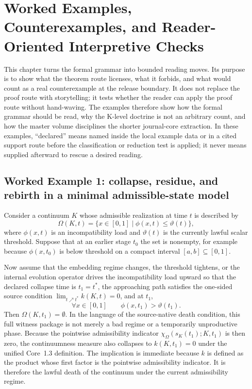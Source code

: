 \section{Worked Examples, Counterexamples, and Reader-Oriented Interpretive Checks}
\label{sec:oc13-worked-examples}

This chapter turns the formal grammar into bounded reading moves. Its purpose
is to show what the theorem route licenses, what it forbids, and what would
count as a real counterexample at the release boundary. It does not replace the
proof route with storytelling; it tests whether the reader can apply the proof
route without hand-waving. The examples therefore show how the formal grammar
should be read, why the K-level doctrine is not an arbitrary count, and how the
master volume disciplines the shorter journal-core extraction.
In these examples, ``declared'' means named inside the local example data or in
a cited support route before the classification or reduction test is applied;
it never means supplied afterward to rescue a desired reading.

\subsection{Worked Example 1: collapse, residue, and rebirth in a minimal admissible-state model}

Consider a continuum \(K\) whose admissible realization at time \(t\) is described by
\[
\Omega(K,t) = \{x \in [0,1] \mid \phi(x,t) \le \vartheta(t)\},
\]
where \(\phi(x,t)\) is an incompatibility load and \(\vartheta(t)\) is the currently lawful scalar
threshold. Suppose that at an earlier stage \(t_0\) the set is nonempty, for example because
\(\phi(x,t_0)\) is below threshold on a compact interval \([a,b]\subseteq [0,1]\).

Now assume that the embedding regime changes, the threshold tightens, or the internal evolution
operator drives the incompatibility load upward so that the declared collapse time is
\(t_1=t^\ast\), the approaching path satisfies the one-sided source condition
\(\lim_{t\nearrow t^\ast} k(K,t)=0\), and at \(t_1\),
\[
\forall x \in [0,1] \qquad \phi(x,t_1) > \vartheta(t_1).
\]
Then \(\Omega(K,t_1)=\emptyset\). In the language of the source-native death condition, this full
witness package is
not merely a bad regime or a temporarily unproductive phase. Because the
pointwise admissibility indicator \(\chi_{\Omega}(s_K(t_1);K,t_1)\) is then zero, the
continuumness measure also collapses to \(k(K,t_1)=0\) under the unified
Core~1.3 definition. The implication is immediate because \(k\) is defined as
the product whose first factor is the pointwise admissibility indicator. It is therefore
the lawful death of the continuum under the current admissibility regime.

